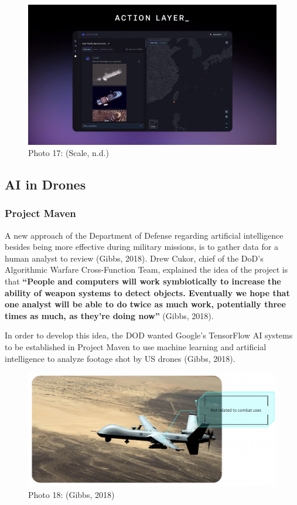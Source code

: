 \documentclass[
]{article}
\begin{document}
\begin{figure}
\centering
\includegraphics{Donovan.jpg}
\caption{Photo 17: (Scale, n.d.)}
\end{figure}

\hypertarget{ai-in-drones}{%
\subsection{AI in Drones}\label{ai-in-drones}}

\hypertarget{project-maven}{%
\subsubsection{Project Maven}\label{project-maven}}

A new approach of the Department of Defense regarding artificial intelligence besides being more effective during military missions, is to gather data for a human analyst to review (Gibbs, 2018). Drew Cukor, chief of the DoD's Algorithmic Warfare Cross-Function Team, explained the idea of the project is that \textbf{``People and computers will work symbiotically to increase the ability of weapon systems to detect objects. Eventually we hope that one analyst will be able to do twice as much work, potentially three times as much, as they're doing now''} (Gibbs, 2018).

In order to develop this idea, the DOD wanted Google's TensorFlow AI systems to be established in Project Maven to use machine learning and artificial intelligence to analyze footage shot by US drones (Gibbs, 2018).

\begin{figure}
\centering
\includegraphics{image.png}
\caption{Photo 18: (Gibbs, 2018)}
\end{figure}
\end{document}

